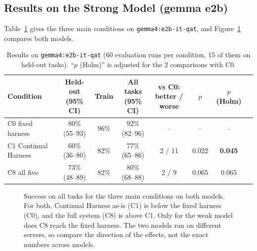 \subsection{Results on the Strong Model (gemma e2b)}

Table~\ref{tab:gemma} gives the three main conditions on \texttt{gemma4:e2b-it-qat}, and
Figure~\ref{fig:models} compares both models.

\begin{table}[t]
\centering
\small
\setlength{\tabcolsep}{4.5pt}
\begin{tabular}{lccccccc}
\toprule
Condition & \makecell{Held-out\\(95\% CI)} & Train & \makecell{All tasks\\(95\% CI)}
  & \makecell{vs C0:\\better / worse} & $p$ & \makecell{$p$\\(Holm)} \\
\midrule
C0 fixed harness     & 80\% (55--93) & 96\% & 92\% (82--96) & --     & --    & -- \\
C1 Continual Harness & 60\% (36--80) & 82\% & 77\% (65--86) & 2 / 11 & 0.022 & \textbf{0.045} \\
C8 all five          & 73\% (48--89) & 82\% & 80\% (68--88) & 2 / 9  & 0.065 & 0.065 \\
\bottomrule
\end{tabular}
\caption{Results on \texttt{gemma4:e2b-it-qat} (60 evaluation runs per condition, 15 of them on
held-out tasks). ``$p$ (Holm)'' is adjusted for the 2 comparisons with C0.}
\label{tab:gemma}
\end{table}

\begin{figure}[t]
\centering
{}
\caption{Success on all tasks for the three main conditions on both models. For both, Continual
Harness as-is (C1) is below the fixed harness (C0), and the full system (C8) is above C1. Only for
the weak model does C8 reach the fixed harness. The two models ran on different servers, so compare
the direction of the effects, not the exact numbers across models.}
\label{fig:models}
\end{figure}

